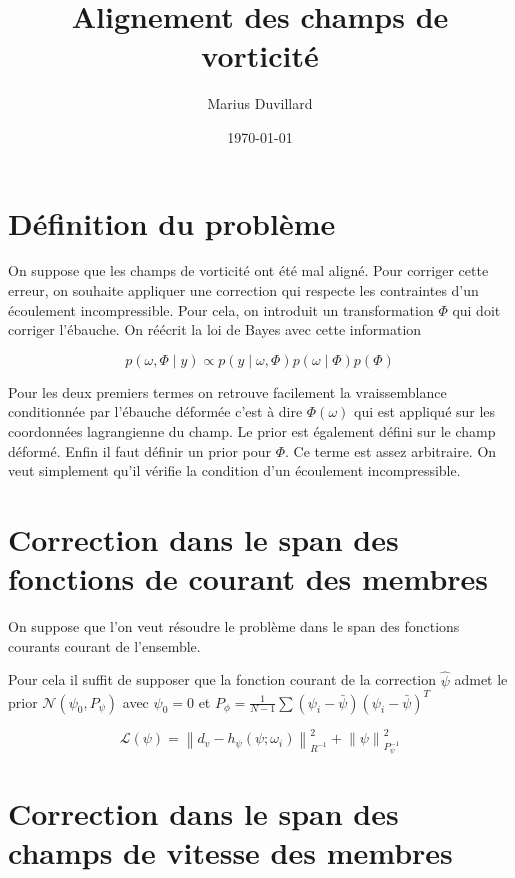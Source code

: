 \documentclass{article}
\newcommand{\norm}[1]{\left\lVert #1 \right\rVert}
\begin{document}
\title{Alignement des champs de vorticité}
\author{Marius Duvillard}
\date{\today}
\maketitle


\section{Définition du problème}
On suppose que les champs de vorticité ont été mal aligné. Pour corriger cette erreur, on souhaite appliquer une correction qui respecte les contraintes d'un écoulement incompressible. Pour cela, on introduit un transformation $\Phi$ qui doit corriger l'ébauche.
On réécrit la loi de Bayes avec cette information

\begin{equation*}
    p(\omega,\Phi \mid y) \propto p(y \mid \omega, \Phi) p(\omega \mid \Phi) p(\Phi)
\end{equation*}

Pour les deux premiers termes on retrouve facilement la vraissemblance conditionnée par l'ébauche déformée c'est à dire $\Phi(\omega)$ qui est appliqué sur les coordonnées lagrangienne du champ.
Le prior est également défini sur le champ déformé. Enfin il faut définir un prior pour $\Phi$. Ce terme est assez arbitraire. On veut simplement qu'il vérifie la condition d'un écoulement incompressible.

\section{Correction dans le span des fonctions de courant des membres}

On suppose que l'on veut résoudre le problème dans le span des fonctions courants courant de l'ensemble.

Pour cela il suffit de supposer que la fonction courant de la correction $\hat \psi$ admet le prior $\mathcal N (\psi_0,  P_\psi)$ avec $\psi_0 = 0$ et $P_\phi =\frac{1}{N - 1}\sum (\psi_i - \bar \psi) (\psi_i - \bar \psi)^T$

\begin{equation*}
    \mathcal L(\psi) = \norm{d_v - h_\psi(\psi; \omega_i)}^2_{R^{-1}} + \norm{\psi}^2_{P^{-1}_{\psi}}
\end{equation*}

\section{Correction dans le span des champs de vitesse des membres}
\end{document}
